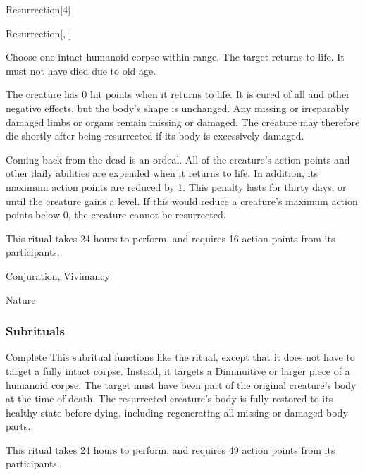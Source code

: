 \begin{spellsection}{Resurrection}[4]


\begin{ability}{Resurrection}[, ]

Choose one intact humanoid corpse within \rngclose range.
The target returns to life.
It must not have died due to old age.

The creature has 0 hit points when it returns to life.
It is cured of all  and other negative effects, but the body's shape is unchanged.
Any missing or irreparably damaged limbs or organs remain missing or damaged.
The creature may therefore die shortly after being resurrected if its body is excessively damaged.

Coming back from the dead is an ordeal.
All of the creature's action points and other daily abilities are expended when it returns to life.
In addition, its maximum action points are reduced by 1.
This penalty lasts for thirty days, or until the creature gains a level.
If this would reduce a creature's maximum action points below 0, the creature cannot be resurrected.

This ritual takes 24 hours to perform, and requires 16 action points from its participants.

\end{ability}




 Conjuration, Vivimancy

 Nature
\end{spellsection}


\subsubsection{Subrituals}


\begin{ability}[\nth{7}]{Complete}
This subritual functions like the  ritual, except that it does not have to target a fully intact corpse.
Instead, it targets a Diminuitive or larger piece of a humanoid corpse.
The target must have been part of the original creature's body at the time of death.
The resurrected creature's body is fully restored to its healthy state before dying, including regenerating all missing or damaged body parts.

This ritual takes 24 hours to perform, and requires 49 action points from its participants.
\end{ability}
\vspace{0.25em}


